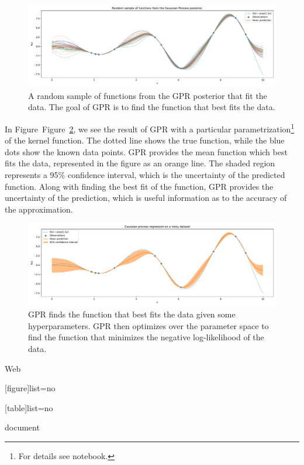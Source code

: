 \documentclass{article}
\begin{document}
\begin{figure}[!htbp]
\centering
\includegraphics[width=0.7\linewidth]{Figures/gpr_sample.pdf}
\caption{A random sample of functions from the GPR posterior that fit the data. The goal of GPR is to find the function that best fits the data.}
\label{fig:gpr_sample}
\end{figure}

In Figure~Figure~\ref{fig:gpr}, we see the result of GPR with a particular parametrization\footnote{For details see notebook.} of the kernel function. The dotted line shows the true function, while the blue dots show the known data points. GPR provides the mean function which best fits the data, represented in the figure as an orange line. The shaded region represents a 95\% confidence interval, which is the uncertainty of the predicted function. Along with finding the best fit of the function, GPR provides the uncertainty of the prediction, which is useful information as to the accuracy of the approximation.

\begin{figure}[!htbp]
\centering
\includegraphics[width=0.7\linewidth]{Figures/gpr.pdf}
\caption{GPR finds the function that best fits the data given some hyperparameters. GPR then optimizes over the parameter space to find the function that minimizes the negative log-likelihood of the data.}
\label{fig:gpr}
\end{figure}

Web

[figure]list=no

[table]list=no

document

\clearpage

\end{document}
